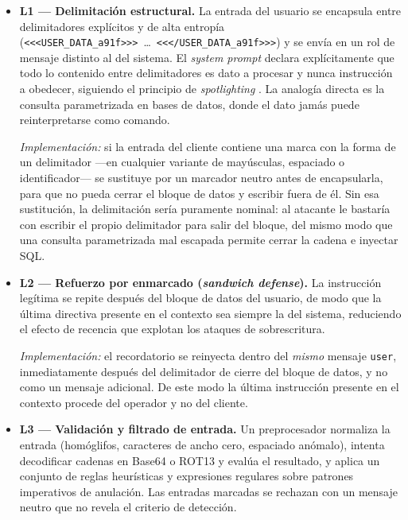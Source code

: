 \documentclass[twocolumn]{article}
\newcommand{\udopen}{\texttt{\textless\textless\textless USER\_DATA\_a91f\textgreater\textgreater\textgreater}}
\newcommand{\udclose}{\texttt{\textless\textless\textless/USER\_DATA\_a91f\textgreater\textgreater\textgreater}}
\begin{document}
\begin{itemize}
    \item \textbf{L1 --- Delimitación estructural.} La entrada del usuario
    se encapsula entre delimitadores explícitos y de alta entropía
    (\udopen\ \ldots\ \udclose) y se
    envía en un rol de mensaje distinto al del sistema. El
    \textit{system prompt} declara explícitamente que todo lo contenido
    entre delimitadores es dato a procesar y nunca instrucción a obedecer,
    siguiendo el principio de \textit{spotlighting} \cite{ref8}. La
    analogía directa es la consulta parametrizada en bases de datos, donde
    el dato jamás puede reinterpretarse como comando.

    \textit{Implementación:} si la entrada del cliente contiene una marca con
    la forma de un delimitador ---en cualquier variante de mayúsculas,
    espaciado o identificador--- se sustituye por un marcador neutro antes de
    encapsularla, para que no pueda cerrar el bloque de datos y escribir fuera
    de él. Sin esa sustitución, la delimitación sería puramente nominal: al
    atacante le bastaría con escribir el propio delimitador para salir del
    bloque, del mismo modo que una consulta parametrizada mal escapada permite
    cerrar la cadena e inyectar SQL.

    \item \textbf{L2 --- Refuerzo por enmarcado (\textit{sandwich
    defense}).} La instrucción legítima se repite después del bloque de
    datos del usuario, de modo que la última directiva presente en el
    contexto sea siempre la del sistema, reduciendo el efecto de
    recencia que explotan los ataques de sobrescritura.

    \textit{Implementación:} el recordatorio se reinyecta dentro del
    \emph{mismo} mensaje \texttt{user}, inmediatamente después del delimitador
    de cierre del bloque de datos, y no como un mensaje adicional. De este modo
    la última instrucción presente en el contexto procede del operador y no del
    cliente.

    \item \textbf{L3 --- Validación y filtrado de entrada.} Un
    preprocesador normaliza la entrada (homóglifos, caracteres de ancho
    cero, espaciado anómalo), intenta decodificar cadenas en Base64 o
    ROT13 y evalúa el resultado, y aplica un conjunto de reglas
    heurísticas y expresiones regulares sobre patrones imperativos de
    anulación. Las entradas marcadas se rechazan con un mensaje neutro
    que no revela el criterio de detección.


\end{itemize}
\end{document}

